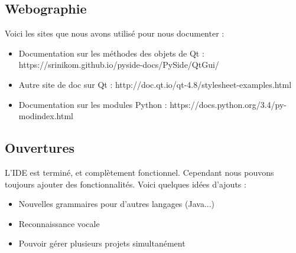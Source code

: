 \documentclass[a4paper,12pt]{article}
\begin{document}
\subsection{Webographie}
	
	Voici les sites que nous avons utilisé pour nous documenter :
	
	\begin{itemize}
		\item Documentation sur les méthodes des objets de Qt : https://srinikom.github.io/pyside-docs/PySide/QtGui/
		\item Autre site de doc sur Qt : http://doc.qt.io/qt-4.8/stylesheet-examples.html
		\item Documentation sur les modules Python : https://docs.python.org/3.4/py-modindex.html
	\end{itemize}
	
\subsection{Ouvertures}

	L'IDE est terminé, et complètement fonctionnel. Cependant nous pouvons toujours ajouter des fonctionnalités. Voici quelques idées d'ajouts :
	
	\begin{itemize}
		\item Nouvelles grammaires pour d'autres langages (Java...)
		\item Reconnaissance vocale
		\item Pouvoir gérer plusieurs projets simultanément
	\end{itemize}
\end{document}
